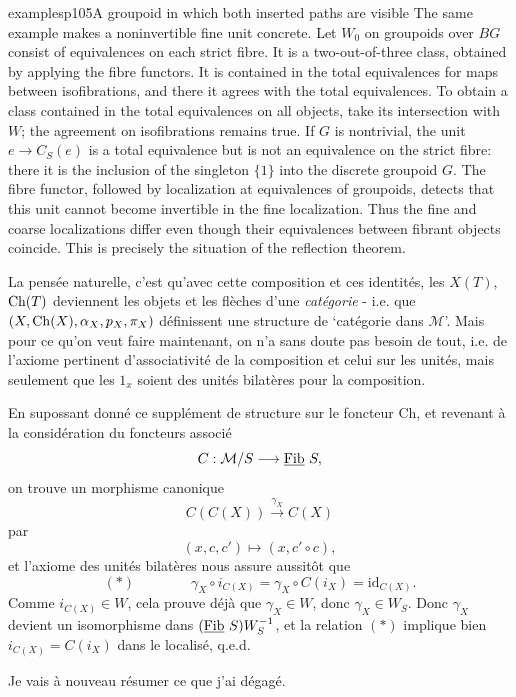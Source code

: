 \begin{dcomment}{examples}{p105}{A groupoid in which both inserted paths are visible}
The same example makes a noninvertible fine unit concrete. Let $W_0$ on groupoids over $BG$ consist of equivalences on each strict fibre. It is a two-out-of-three class, obtained by applying the fibre functors. It is contained in the total equivalences for maps between isofibrations, and there it agrees with the total equivalences. To obtain a class contained in the total equivalences on all objects, take its intersection with $W$; the agreement on isofibrations remains true. If $G$ is nontrivial, the unit $e\to C_S(e)$ is a total equivalence but is not an equivalence on the strict fibre: there it is the inclusion of the singleton $\{1\}$ into the discrete groupoid $G$. The fibre functor, followed by localization at equivalences of groupoids, detects that this unit cannot become invertible in the fine localization. Thus the fine and coarse localizations differ even though their equivalences between fibrant objects coincide. This is precisely the situation of the reflection theorem.
\end{dcomment}




La pensée naturelle, c'est qu'avec cette composition et ces identités, les $X(T)$, $\mathrm{Ch}(T)$ deviennent les objets et les flèches d'une \textit{catégorie} - i.e. que $(X,\mathrm{Ch}(X),\alpha_X,p_X,\pi_X)$ définissent une structure de ‘catégorie dans $\mathcal{M}$’. Mais pour ce qu'on veut faire maintenant, on n'a sans doute pas besoin de tout, i.e.
de l'axiome pertinent d'associativité de la composition et celui sur les unités, mais seulement que les $1_x$ soient des unités bilatères pour la composition.

En supossant donné ce supplément de structure sur le foncteur Ch, et revenant à la considération du foncteurs associé %
\[
C : \mathcal{M}/S\longrightarrow\underline{\mathrm{Fib}}\,\,S,
\]
on trouve un morphisme canonique
\[
C(C(X))\xrightarrow{\gamma_X}C(X)
\]
par
\[
(x,c,c')\longmapsto(x,c'\circ c),
\]
et l'axiome des unités bilatères nous assure aussitôt que
\[
(\ast)\qquad\qquad\gamma_X\circ i_{C(X)}=\gamma_X\circ C(i_X)=\mathrm{id}_{C(X)}.
\]
Comme $i_{C(X)}\in W$, cela prouve déjà que $\gamma_X\in W$, donc $\gamma_X\in W_S$. Donc $\gamma_X$ devient un isomorphisme dans $(\underline{\mathrm{Fib}}\,\,S)W_S^{-1}$, et la relation $(\ast)$ implique bien $i_{C(X)}=C(i_X)$ dans le localisé, q.e.d.

Je vais à nouveau résumer ce que j'ai dégagé.

